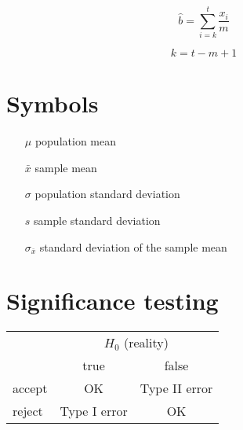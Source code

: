 \documentclass[a4paper]{article}
\begin{document}
\begin{equation}
\widehat{b} = \sum_{i=k}^t \frac{x_i}{m}
\end{equation}

\[k = t - m + 1\]

\section{Symbols}

\begin{itemize}
\item[$\mu$] population mean
\item[$\bar{x}$] sample mean
\item[$\sigma$] population standard deviation
\item[$s$] sample standard deviation
\item[$\sigma_{\bar{x}}$] standard deviation of the sample mean
\end{itemize}

\section{Significance testing}

\begin{tabular}{l|c|c}
& \multicolumn{2}{c}{$H_{0}$ (reality)} \\
& true & false \\ \hline
accept & OK & Type II error \\
reject & Type I error & OK \\
\end{tabular}

\onecolumn
\end{document}
